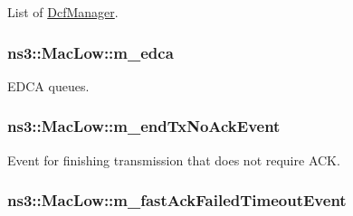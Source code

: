 List of \hyperlink{classns3_1_1DcfManager}{Dcf\+Manager}. 

\subsubsection[{\texorpdfstring{m\+\_\+edca}{m_edca}}]{ ns3\+::\+Mac\+Low\+::m\+\_\+edca\hspace{0.3cm}{\ttfamily [private]}}\hypertarget{classns3_1_1MacLow_a754751ba4152c9337611a5f015045a44}{}\label{classns3_1_1MacLow_a754751ba4152c9337611a5f015045a44}


E\+D\+CA queues. 

\subsubsection[{\texorpdfstring{m\+\_\+end\+Tx\+No\+Ack\+Event}{m_endTxNoAckEvent}}]{ ns3\+::\+Mac\+Low\+::m\+\_\+end\+Tx\+No\+Ack\+Event\hspace{0.3cm}{\ttfamily [private]}}\hypertarget{classns3_1_1MacLow_a25990734c06d4df0d75276f52e103f8a}{}\label{classns3_1_1MacLow_a25990734c06d4df0d75276f52e103f8a}


Event for finishing transmission that does not require A\+CK. 

\subsubsection[{\texorpdfstring{m\+\_\+fast\+Ack\+Failed\+Timeout\+Event}{m_fastAckFailedTimeoutEvent}}]{ ns3\+::\+Mac\+Low\+::m\+\_\+fast\+Ack\+Failed\+Timeout\+Event\hspace{0.3cm}{\ttfamily [private]}}\hypertarget{classns3_1_1MacLow_af34b1f498e3b5a25a62fd4bf5f6f943a}{}\label{classns3_1_1MacLow_af34b1f498e3b5a25a62fd4bf5f6f943a}


